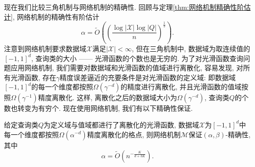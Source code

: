 现在我们比较三角机制与网络机制的精确性. 回顾与定理\ref{thm:网络机制精确性阶估计}, 网络机制的精确性有阶估计
  \begin{equation}\label{eq:网络机制精确性阶估计}
    \alpha = \tilde{O}\left(\left(\frac{\log|\mathcal{X}|\log|Q|}{n}\right)^{\frac{1}{3}}\right). 
  \end{equation}
  注意到网络机制要求数据域$\mathcal{X}$满足$|\mathcal{X}| < \infty$, 但在三角机制中, 数据域为取连续值的$[-1, 1]^d$, 查询类的大小 ------ 光滑函数的个数也是无穷的. 为了对光滑函数查询问题应用网络机制, 我们需要对数据域和光滑函数的值域进行离散化, 容易发现, 对所有光滑函数, 存在$\gamma$精度误差逼近的充要条件是对光滑函数的定义域: 即数据域$[-1, 1]^d$的每一个维度都按照$\Omega\left(\gamma^{-d}\right)$的精度进行离散化, 并且光滑函数的值域按照$\Omega\left(\gamma^{-1}\right)$精度离散化. 这样, 离散化之后的数据域大小为$\Omega\left(\gamma^{-d}\right)$, 查询类$Q$的个数也转变为有穷个. 现在使用网络机制, 我们有以下精确性保证.
\begin{prop}[网络机制对光滑函数查询的精确性保证]\label{prop:网络机制对光滑函数查询的精确性保证}
  给定查询类$Q$为定义域与值域都进行了离散化的光滑函数, 数据域$\mathcal{X}$为$[-1, 1]^d$中每一个维度都按照$\Omega(\alpha^{-d})$精度离散化的格点, 则网络机制$\mathcal{M}$保证$(\alpha, \beta)$-精确性, 其中
  \[
    \alpha = \tilde{O} \left( n^{-\frac{K}{d+3K}}\right).
  \]
\end{prop}
